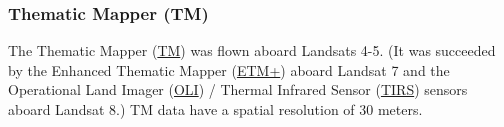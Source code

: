 \documentclass[
]{article}
\begin{document}
\hypertarget{thematic-mapper-tm}{%
\subsubsection{Thematic Mapper (TM)}\label{thematic-mapper-tm}}

The Thematic Mapper (\href{https://landsat.gsfc.nasa.gov/landsat-4-5/tm}{TM}) was flown aboard Landsats 4-5. (It was succeeded by the Enhanced Thematic Mapper (\href{https://landsat.gsfc.nasa.gov/about/enhanced-thematic-mapper}{ETM+}) aboard Landsat 7 and the Operational Land Imager (\href{https://landsat.gsfc.nasa.gov/landsat-8/operational-land-imager}{OLI}) / Thermal Infrared Sensor (\href{https://landsat.gsfc.nasa.gov/landsat-8/thermal-infrared-sensor-tirs}{TIRS}) sensors aboard Landsat 8.) TM data have a spatial resolution of 30 meters.
\end{document}
